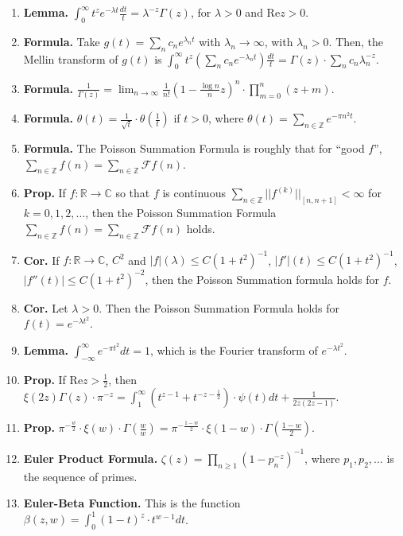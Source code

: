 \begin{enumerate}
	\item \textbf{Lemma. } $\int_{0}^{\infty} t^z e^{-\lambda t} \frac{dt}{t} = \lambda^{-z} \Gamma(z)$, for $\lambda>0$ and $\textrm{Re}z>0$. 
	\item \textbf{Formula. } Take $g(t) = \sum_n c_n e^{\lambda_n t}$ with $\lambda_n \to \infty$, with $\lambda_n > 0$. Then, the Mellin transform of $g(t)$ is $\int_{0}^{\infty} t^z (\sum_n c_n e^{-\lambda_n t}) \frac{dt}{t} = \Gamma(z) \cdot \sum_n c_n \lambda_n^{-z}$. 
	\item \textbf{Formula. } $\frac{1}{\Gamma(z)} = \lim_{n \to \infty} \frac{1}{n!} \left(1 - \frac{\log n}{n}z\right)^n \cdot \prod_{m=0}^n (z+m)$. 
	\item \textbf{Formula. } $\theta(t) = \frac{1}{\sqrt{t}} \cdot \theta(\frac{1}{t})$ if $t>0$, where $\theta(t) = \sum_{n \in \mathbb{Z}} e^{-\pi n^2 t}$. 
	\item \textbf{Formula. } The Poisson Summation Formula is roughly that for \enquote{good $f$}, $\sum_{n \in \mathbb{Z}} f(n) = \sum_{n \in \mathbb{Z}} \mathscr{F}f(n)$. 
	\item \textbf{Prop. } If $f: \mathbb{R} \to \mathbb{C}$ so that $f$ is continuous $\sum_{n \in \mathbb{Z}} ||f^{(k)}||_{[n,n+1]} < \infty$ for $k=0,1,2,\dots$, then the Poisson Summation Formula $\sum_{n \in \mathbb{Z}} f(n) = \sum_{n \in \mathbb{Z}} \mathscr{F}f(n)$ holds. 
	\item \textbf{Cor. } If $f: \mathbb{R} \to \mathbb{C}$, $C^2$ and $|f|(\lambda) \leq C(1+t^2)^{-1}$, $|f'|(t) \leq C(1+t^2)^{-1}$, $|f''(t)| \leq C(1+t^2)^{-2}$, then the Poisson Summation formula holds for $f$. 
	\item \textbf{Cor. } Let $\lambda>0$. Then the Poisson Summation Formula holds for $f(t) = e^{-\lambda t^2}$. 
	\item \textbf{Lemma. } $\int_{-\infty}^{\infty} e^{-\pi t^2} dt = 1$, which is the Fourier transform of $e^{-\lambda t^2}$. 
	\item \textbf{Prop. } If $\textrm{Re} z > \frac{1}{2}$, then $\xi(2z)\Gamma(z) \cdot \pi^{-z} = \int_{1}^{\infty} \left(t^{z-1}+ t^{-z - \frac{1}{2}}\right) \cdot \psi(t) dt + \frac{1}{2z(2z-1)}$. 
	\item \textbf{Prop. } $\pi^{-\frac{w}{2}} \cdot \xi(w) \cdot \Gamma(\frac{w}{w}) = \pi^{-\frac{1-w}{2}} \cdot \xi(1-w) \cdot \Gamma(\frac{1-w}{2})$. 
	\item \textbf{Euler Product Formula. } $\zeta(z) = \prod_{n \geq 1} (1 - p_n^{-z})^{-1}$, where $p_1,p_2,\dots$ is the sequence of primes. 
	\item \textbf{Euler-Beta Function. } This is the function $\beta(z,w) = \int_{0}^{1} (1-t)^{z} \cdot t^{w-1} dt$. 

\end{enumerate}
